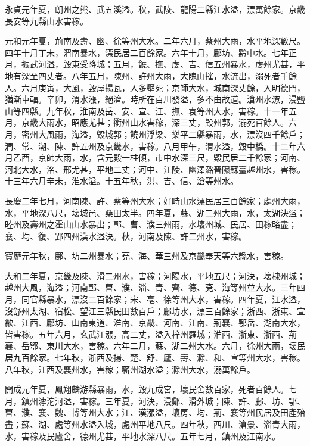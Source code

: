 \begin{pinyinscope}
 永貞元年夏，朗州之熊、武五溪溢。秋，武陵、龍陽二縣江水溢，漂萬餘家。京畿長安等九縣山水害稼。



 元和元年夏，荊南及壽、幽、徐等州大水。二年六月，蔡州大雨，水平地深數尺。四年十月丁未，渭南暴水，漂民居二百餘家。六年十月，鄜坊、黔中水。七年正月，振武河溢，毀東受降城；五月，饒、撫、虔、吉、信五州暴水，虔州尤甚，平地有深至四丈者。八年五月，陳州、許州大雨，大隗山摧，水流出，溺死者千餘人。六月庚寅，大風，毀屋揚瓦，人多壓死；京師大水，城南深丈餘，入明德門，猶漸車輻。辛卯，渭水漲，絕濟。時所在百川發溢，多不由故道。滄州水潦，浸鹽山等四縣。九年秋，淮南及岳、安、宣、江、撫、袁等州大水，害稼。十一年五月，京畿大雨水，昭應尤甚；衢州山水害稼，深三丈，毀州郭，溺死百餘人。六月，密州大風雨，海溢，毀城郭；饒州浮梁、樂平二縣暴雨，水，漂沒四千餘戶；潤、常、潮、陳、許五州及京畿水，害稼。八月甲午，渭水溢，毀中橋。十二年六月乙酉，京師大雨，水，含元殿一柱傾，市中水深三尺，毀民居二千餘家；河南、河北大水，洺、邢尤甚，平地二丈；河中、江陵、幽澤潞晉隰蘇臺越州水，害稼。十三年六月辛未，淮水溢。十五年秋，洪、吉、信、滄等州水。



 長慶二年七月，河南陳、許、蔡等州大水；好畤山水漂民居三百餘家；處州大雨，水，平地深八尺，壞城邑、桑田太半。四年夏，蘇、湖二州大雨，水，太湖決溢；睦州及壽州之霍山山水暴出；鄆、曹、濮三州雨，水壞州城、民居、田稼略盡；襄、均、復、郢四州漢水溢決。秋，河南及陳、許二州水，害稼。



 寶歷元年秋，鄜、坊二州暴水；兗、海、華三州及京畿奉天等六縣水，害稼。



 大和二年夏，京畿及陳、滑二州水，害稼；河陽水，平地五尺；河決，壞棣州城；越州大風，海溢；河南鄆、曹、濮、淄、青、齊、德、兗、海等州並大水。三年四月，同官縣暴水，漂沒二百餘家；宋、亳、徐等州大水，害稼。四年夏，江水溢，沒舒州太湖、宿松、望江三縣民田數百戶；鄜坊水，漂三百餘家；浙西、浙東、宣歙、江西、鄜坊、山南東道、淮南、京畿、河南、江南、荊襄、鄂岳、湖南大水，皆害稼。五年六月，玄武江漲，高二丈，溢入梓州羅城；淮西、浙東、浙西、荊襄、岳鄂、東川大水，害稼。六年二月，蘇、湖二州大水。六月，徐州大雨，壞民居九百餘家。七年秋，浙西及揚、楚、舒、廬、壽、滁、和、宣等州大水，害稼。八年秋，江西及襄州水，害稼；蘄州湖水溢；滁州大水，溺萬餘戶。



 開成元年夏，鳳翔麟游縣暴雨，水，毀九成宮，壞民舍數百家，死者百餘人。七月，鎮州滹沱河溢，害稼。三年夏，河決，浸鄭、滑外城；陳、許、鄜、坊、鄂、曹、濮、襄、魏、博等州大水；江、漢漲溢，壞房、均、荊、襄等州民居及田產殆盡；蘇、湖、處等州水溢入城，處州平地八尺。四年秋，西川、滄景、淄青大雨，水，害稼及民廬舍，德州尤甚，平地水深八尺。五年七月，鎮州及江南水。




\end{pinyinscope}

